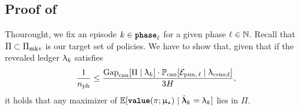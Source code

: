 \subsection{Proof of  \label{proof:prop_mdp_hh}}

\newcommand{\ledvarhat}{\hat{\ledvar}}
\newcommand{\Zhal}{Z_{\mathrm{hal}}}
\newcommand{\phal}{p_{\mathrm{hal}}}
\newcommand{\Bernoulli}{\mathrm{Bernoulli}}
\newcommand{\khatexpl}{\widehat{\bm{k}}_{\ell}^{\mathrm{\ell}}}

Thourought, we fix an episode $k \in {\normalfont \texttt{\textbf{phase}}}_{\ell}$ for a given phase $\ell \in \mathbb{N}$. Recall that $\Pi \subset \Pi_{\mathrm{mkv}}$ is our target set of policies. We have to show that, given that if the revealed ledger $\uplambda_k$ satisfies
\begin{align}
\frac{1}{n_{\mathrm{ph}}} \le \frac{\mathrm{Gap}_{\mathrm{can}}[\Pi \mid \uplambda_k] \cdot \operatorname{\mathbb{P}}_{\mathrm{can}}[\mathcal{E}_{\mathrm{pun},\,\ell}\mid \uplambda_{\mathrm{cens};\ell}]}{3H},
\label{eq:hh_condition}
\end{align}
it holds that any maximizer of $\Exp[\valuef{\pi}{\modst} \mid \ledvarhat_k = \ledger_k]$ lies in $\Pi$.


